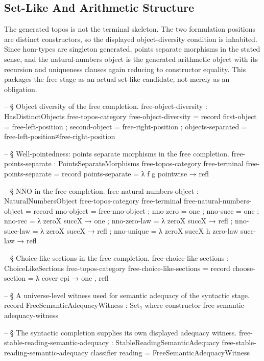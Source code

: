 \documentclass[11pt]{article}
\begin{document}
\subsection{Set-Like And Arithmetic Structure}

The generated topos is not the terminal skeleton.  The two formulation
positions are distinct constructors, so the displayed object-diversity
condition is inhabited.  Since hom-types are singleton generated, points
separate morphisms in the stated sense, and the natural-numbers object is
the generated arithmetic object with its recursion and uniqueness clauses
again reducing to constructor equality.  This packages the free stage as
an actual set-like candidate, not merely as an obligation.

\begin{code}

-- § Object diversity of the free completion.
free-object-diversity : HasDistinctObjects free-topos-category
free-object-diversity = record
  { first-object      = free-left-position
  ; second-object     = free-right-position
  ; objects-separated = free-left-position≠free-right-position
  }

-- § Well-pointedness: points separate morphisms in the free completion.
free-points-separate :
  PointsSeparateMorphisms free-topos-category free-terminal
free-points-separate = record
  { points-separate = λ f g pointwise → refl
  }

-- § NNO in the free completion.
free-natural-numbers-object :
  NaturalNumbersObject free-topos-category free-terminal
free-natural-numbers-object = record
  { nno-object    = free-nno-object
  ; nno-zero      = one
  ; nno-succ      = one
  ; nno-rec       = λ zeroX succX → one
  ; nno-zero-law  = λ zeroX succX → refl
  ; nno-succ-law  = λ zeroX succX → refl
  ; nno-unique    = λ zeroX succX h zero-law succ-law → refl
  }

-- § Choice-like sections in the free completion.
free-choice-like-sections : ChoiceLikeSections free-topos-category
free-choice-like-sections = record
  { choose-section = λ cover epi → one , refl
  }

-- § A universe-level witness used for semantic adequacy of the syntactic stage.
record FreeSemanticAdequacyWitness : Set₁ where
  constructor free-semantic-adequacy-witness

-- § The syntactic completion supplies its own displayed adequacy witness.
free-stable-reading-semantic-adequacy : StableReadingSemanticAdequacy
free-stable-reading-semantic-adequacy classifier reading =
  FreeSemanticAdequacyWitness


\end{code}
\end{document}
